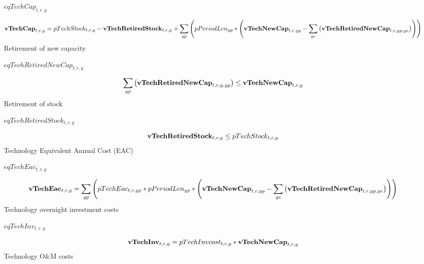 \documentclass{article}
\begin{document}
$eqTechCap_{t,r,y}$





\begin{dmath} 
{\bf vTechCap}_{t,r,y}  =  pTechStock_{t,r,y}-{\bf vTechRetiredStock}_{t,r,y}+\sum_{yp}{\left(pPeriodLen_{yp}*\left({\bf vTechNewCap}_{t,r,yp}-\sum_{ye}{\left({\bf vTechRetiredNewCap}_{t,r,yp,ye}\right)}\right)\right)}
\end{dmath} 
Retirement of new capacity







$eqTechRetiredNewCap_{t,r,y}$





\begin{dmath} 
\sum_{yp}{\left({\bf vTechRetiredNewCap}_{t,r,y,yp}\right)}  \le  {\bf vTechNewCap}_{t,r,y}
\end{dmath} 
Retirement of stock







$eqTechRetiredStock_{t,r,y}$





\begin{dmath} 
{\bf vTechRetiredStock}_{t,r,y}  \le  pTechStock_{t,r,y}
\end{dmath} 
Technology Equivalent Annual Cost (EAC)







$eqTechEac_{t,r,y}$





\begin{dmath} 
{\bf vTechEac}_{t,r,y}  =  \sum_{yp}{\left(pTechEac_{t,r,yp}*pPeriodLen_{yp}*\left({\bf vTechNewCap}_{t,r,yp}-\sum_{ye}{\left({\bf vTechRetiredNewCap}_{t,r,yp,ye}\right)}\right)\right)}
\end{dmath} 
Technology overnight investment costs







$eqTechInv_{t,r,y}$





\begin{dmath} 
{\bf vTechInv}_{t,r,y}  =  pTechInvcost_{t,r,y}*{\bf vTechNewCap}_{t,r,y}
\end{dmath} 
Technology O\&M costs
\end{document}
